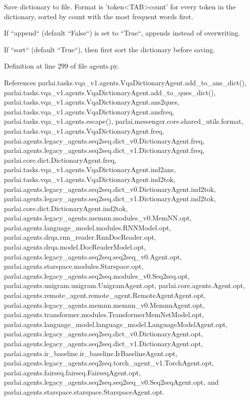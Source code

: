 \begin{DoxyVerb}Save dictionary to file.
Format is 'token<TAB>count' for every token in the dictionary, sorted
by count with the most frequent words first.

If ``append`` (default ``False``) is set to ``True``, appends instead
of overwriting.

If ``sort`` (default ``True``), then first sort the dictionary before
saving.
\end{DoxyVerb}
 

Definition at line 299 of file agents.\+py.



References parlai.\+tasks.\+vqa\+\_\+v1.\+agents.\+Vqa\+Dictionary\+Agent.\+add\+\_\+to\+\_\+ans\+\_\+dict(), parlai.\+tasks.\+vqa\+\_\+v1.\+agents.\+Vqa\+Dictionary\+Agent.\+add\+\_\+to\+\_\+ques\+\_\+dict(), parlai.\+tasks.\+vqa\+\_\+v1.\+agents.\+Vqa\+Dictionary\+Agent.\+ans2ques, parlai.\+tasks.\+vqa\+\_\+v1.\+agents.\+Vqa\+Dictionary\+Agent.\+ansfreq, parlai.\+tasks.\+vqa\+\_\+v1.\+agents.\+escape(), parlai.\+messenger.\+core.\+shared\+\_\+utils.\+format, parlai.\+tasks.\+vqa\+\_\+v1.\+agents.\+Vqa\+Dictionary\+Agent.\+freq, parlai.\+agents.\+legacy\+\_\+agents.\+seq2seq.\+dict\+\_\+v0.\+Dictionary\+Agent.\+freq, parlai.\+agents.\+legacy\+\_\+agents.\+seq2seq.\+dict\+\_\+v1.\+Dictionary\+Agent.\+freq, parlai.\+core.\+dict.\+Dictionary\+Agent.\+freq, parlai.\+tasks.\+vqa\+\_\+v1.\+agents.\+Vqa\+Dictionary\+Agent.\+ind2ans, parlai.\+tasks.\+vqa\+\_\+v1.\+agents.\+Vqa\+Dictionary\+Agent.\+ind2tok, parlai.\+agents.\+legacy\+\_\+agents.\+seq2seq.\+dict\+\_\+v0.\+Dictionary\+Agent.\+ind2tok, parlai.\+agents.\+legacy\+\_\+agents.\+seq2seq.\+dict\+\_\+v1.\+Dictionary\+Agent.\+ind2tok, parlai.\+core.\+dict.\+Dictionary\+Agent.\+ind2tok, parlai.\+agents.\+legacy\+\_\+agents.\+memnn.\+modules\+\_\+v0.\+Mem\+N\+N.\+opt, parlai.\+agents.\+language\+\_\+model.\+modules.\+R\+N\+N\+Model.\+opt, parlai.\+agents.\+drqa.\+rnn\+\_\+reader.\+Rnn\+Doc\+Reader.\+opt, parlai.\+agents.\+drqa.\+model.\+Doc\+Reader\+Model.\+opt, parlai.\+agents.\+legacy\+\_\+agents.\+seq2seq.\+seq2seq\+\_\+v0.\+Agent.\+opt, parlai.\+agents.\+starspace.\+modules.\+Starspace.\+opt, parlai.\+agents.\+legacy\+\_\+agents.\+seq2seq.\+modules\+\_\+v0.\+Seq2seq.\+opt, parlai.\+agents.\+unigram.\+unigram.\+Unigram\+Agent.\+opt, parlai.\+core.\+agents.\+Agent.\+opt, parlai.\+agents.\+remote\+\_\+agent.\+remote\+\_\+agent.\+Remote\+Agent\+Agent.\+opt, parlai.\+agents.\+legacy\+\_\+agents.\+memnn.\+memnn\+\_\+v0.\+Memnn\+Agent.\+opt, parlai.\+agents.\+transformer.\+modules.\+Transformer\+Mem\+Net\+Model.\+opt, parlai.\+agents.\+language\+\_\+model.\+language\+\_\+model.\+Language\+Model\+Agent.\+opt, parlai.\+agents.\+legacy\+\_\+agents.\+seq2seq.\+dict\+\_\+v0.\+Dictionary\+Agent.\+opt, parlai.\+agents.\+legacy\+\_\+agents.\+seq2seq.\+dict\+\_\+v1.\+Dictionary\+Agent.\+opt, parlai.\+agents.\+ir\+\_\+baseline.\+ir\+\_\+baseline.\+Ir\+Baseline\+Agent.\+opt, parlai.\+agents.\+legacy\+\_\+agents.\+seq2seq.\+torch\+\_\+agent\+\_\+v1.\+Torch\+Agent.\+opt, parlai.\+agents.\+fairseq.\+fairseq.\+Fairseq\+Agent.\+opt, parlai.\+agents.\+legacy\+\_\+agents.\+seq2seq.\+seq2seq\+\_\+v0.\+Seq2seq\+Agent.\+opt, and parlai.\+agents.\+starspace.\+starspace.\+Starspace\+Agent.\+opt.

